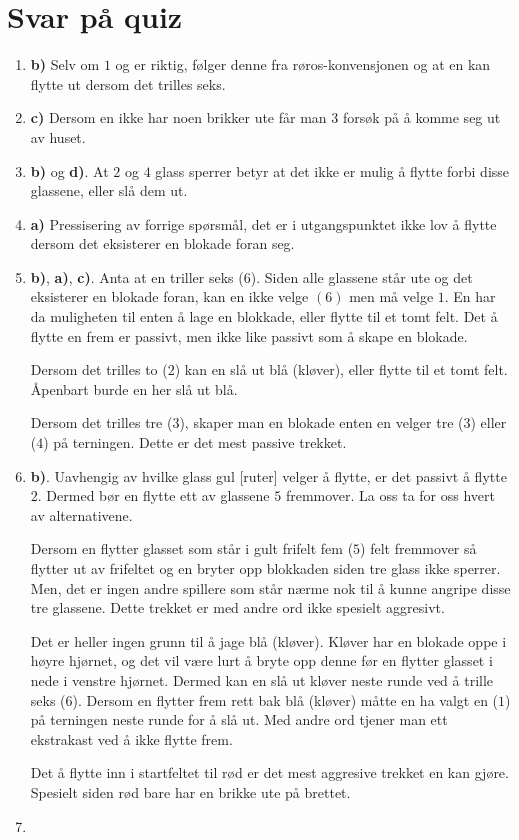 \documentclass[10pt,a4paper,norsk,openany]{book}
\begin{document}
\section{Svar på quiz}

\begin{enumerate}
  \item \textbf{b)} Selv om $1$ og er riktig, følger denne fra
    røros-konvensjonen og at en kan flytte ut dersom det trilles seks.
  \item \textbf{c)} Dersom en ikke har noen brikker ute får man $3$ forsøk på
    å komme seg ut av huset.
  \item \textbf{b)} og \textbf{d)}. At $2$ og $4$ glass sperrer betyr at
    det ikke er mulig å flytte forbi disse glassene, eller slå dem ut.
  \item \textbf{a)} Pressisering av forrige spørsmål, det er i utgangspunktet
    ikke lov å flytte dersom det eksisterer en blokade foran seg.
  \item \textbf{b)}, \textbf{a)}, \textbf{c)}. Anta at en triller seks ($6$).
    Siden alle glassene står ute og det eksisterer en blokade foran, kan en ikke
    velge $(6)$ men må velge
    $1$. En har da muligheten til enten å lage en blokkade, eller flytte til et
    tomt felt. Det å flytte en frem er passivt, men ikke like passivt som å
    skape en blokade.

    Dersom det trilles to ($2$) kan en slå ut blå (kløver), eller flytte til et
    tomt felt. Åpenbart burde en her slå ut blå.

    Dersom det trilles tre ($3$), skaper man en blokade enten en velger tre
    ($3$) eller ($4$) på terningen. Dette er det mest passive trekket.
  \item \textbf{b)}. Uavhengig av hvilke glass gul [ruter] velger å flytte,
    er det passivt å flytte $2$. Dermed bør en flytte ett av glassene $5$
    fremmover. La oss ta for oss hvert av alternativene.

    Dersom en flytter glasset som står i gult frifelt fem ($5$) felt fremmover
    så flytter ut av frifeltet og en bryter opp blokkaden siden tre
    glass ikke sperrer. Men, det er ingen andre spillere som står nærme nok til
    å kunne angripe disse tre glassene. Dette trekket er med andre ord ikke
    spesielt aggresivt.

    Det er heller ingen grunn til å jage blå (kløver). Kløver har en blokade
    oppe i høyre hjørnet, og det vil være lurt å bryte opp denne før en flytter
    glasset i nede i venstre hjørnet. Dermed kan en slå ut kløver neste runde
    ved å trille seks ($6$). Dersom en flytter frem rett bak blå
    (kløver) måtte en ha valgt en ($1$) på terningen neste runde for å slå ut.
    Med andre ord tjener man ett ekstrakast ved å ikke flytte frem.

    Det å flytte inn i startfeltet til rød er det mest aggresive trekket en kan
    gjøre. Spesielt siden rød bare har en brikke ute på brettet.
  \item 
\end{enumerate}
\end{document}
